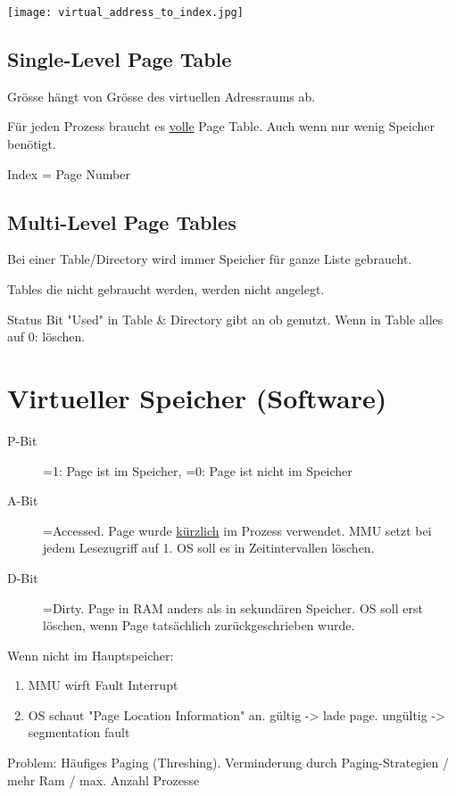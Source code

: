 \begin{multicols*}{4}
\texttt{[image: virtual\_address\_to\_index.jpg]}

\subsection{Single-Level Page Table}
Grösse hängt von Grösse des virtuellen Adressraums ab.

Für jeden Prozess braucht es \underline{volle} Page Table. Auch wenn nur wenig Speicher benötigt.

Index = Page Number

\subsection{Multi-Level Page Tables}
Bei einer Table/Directory wird immer Speicher für ganze Liste gebraucht.

Tables die nicht gebraucht werden, werden nicht angelegt.

Status Bit "Used" in Table \& Directory gibt an ob genutzt. Wenn in Table alles auf 0: löschen.

\section{Virtueller Speicher (Software)}
\begin{description}
    \item[P-Bit] =1: Page ist im Speicher, =0: Page ist nicht im Speicher
    \item[A-Bit] =Accessed. Page wurde \underline{kürzlich} im Prozess verwendet. MMU setzt bei jedem Lesezugriff auf 1. OS soll es in Zeitintervallen löschen.
    \item[D-Bit] =Dirty. Page in RAM anders als in sekundären Speicher. OS soll erst löschen, wenn Page tatsächlich zurückgeschrieben wurde.
\end{description}
\vspace{2pt}
Wenn nicht im Hauptspeicher:
\begin{enumerate}
    \item MMU wirft Fault Interrupt
    \item OS schaut "Page Location Information" an. gültig -> lade page. ungültig -> segmentation fault
\end{enumerate}

Problem: Häufiges Paging (Threshing). Verminderung durch Paging-Strategien / mehr Ram / max. Anzahl Prozesse


\end{multicols*}
